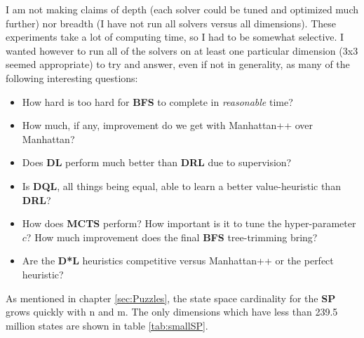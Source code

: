 \noindent I am not making claims of depth (each solver could be tuned and optimized much further) nor breadth (I have not run all solvers versus all dimensions). These experiments take a lot of computing time, so I had to be somewhat selective. I wanted however to run all of the solvers on at least one particular dimension (3x3 seemed appropriate) to try and answer, even if not in generality, as many of the following interesting questions:
\begin{itemize}
\item How hard is too hard for \textbf{BFS} to complete in \textit{reasonable} time?
\item How much, if any, improvement do we get with Manhattan++ over Manhattan?
\item Does \textbf{DL} perform much better than \textbf{DRL} due to supervision?
\item Is \textbf{DQL}, all things being equal, able to learn a better value-heuristic than \textbf{DRL}?
\item How does \textbf{MCTS} perform? How important is it to tune the hyper-parameter $c$? How much improvement does the final \textbf{BFS} tree-trimming bring?
\item Are the \textbf{D*L} heuristics competitive versus Manhattan++ or the perfect heuristic?
\end{itemize}












\label{sec:SPLowDimension}


As mentioned in chapter \ref{sec:Puzzles}, the state space cardinality for the \textbf{SP} grows quickly with n and m. The only dimensions which have less than 239.5 million states are shown in table \ref{tab:smallSP}.

